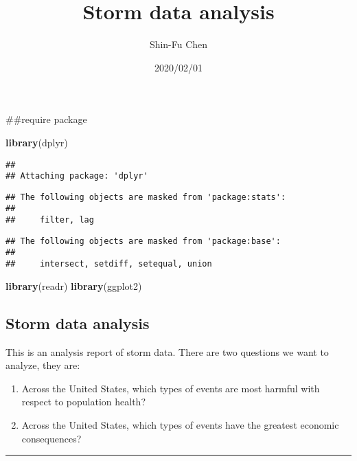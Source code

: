 \documentclass[
]{article}
\title{Storm data analysis}
\author{Shin-Fu Chen}
\date{2020/02/01}
\newenvironment{Shaded}{\begin{snugshade}}{\end{snugshade}}
\newcommand{\KeywordTok}[1]{\textcolor[rgb]{0.13,0.29,0.53}{\textbf{#1}}}
\newcommand{\NormalTok}[1]{#1}
\begin{document}
\maketitle

\#\#require package

\begin{Shaded}
\begin{Highlighting}[]
\KeywordTok{library}\NormalTok{(dplyr)}
\end{Highlighting}
\end{Shaded}

\begin{verbatim}
## 
## Attaching package: 'dplyr'
\end{verbatim}

\begin{verbatim}
## The following objects are masked from 'package:stats':
## 
##     filter, lag
\end{verbatim}

\begin{verbatim}
## The following objects are masked from 'package:base':
## 
##     intersect, setdiff, setequal, union
\end{verbatim}

\begin{Shaded}
\begin{Highlighting}[]
\KeywordTok{library}\NormalTok{(readr)}
\KeywordTok{library}\NormalTok{(ggplot2)}
\end{Highlighting}
\end{Shaded}

\hypertarget{storm-data-analysis}{%
\subsection{Storm data analysis}\label{storm-data-analysis}}

This is an analysis report of storm data. There are two questions we
want to analyze, they are:

\begin{enumerate}
\def\labelenumi{\arabic{enumi}.}
\item
  Across the United States, which types of events are most harmful with
  respect to population health?
\item
  Across the United States, which types of events have the greatest
  economic consequences?
\end{enumerate}

\begin{center}\rule{0.5\linewidth}{0.5pt}\end{center}
\end{document}
